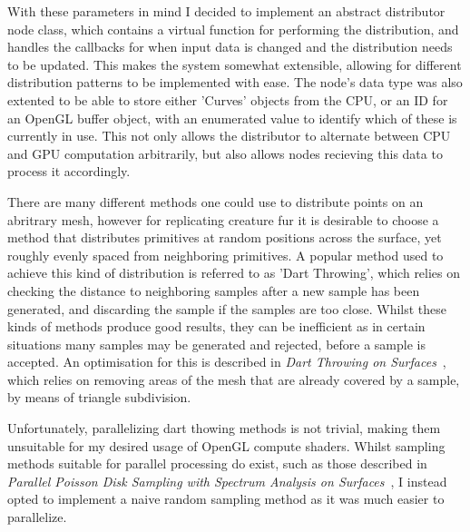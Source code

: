 \documentclass[]{acmsiggraph}
\begin{document}
With these parameters in mind I decided to implement an abstract distributor node class, which contains a virtual function for performing the distribution, and handles the callbacks for when input data is changed and the distribution needs to be updated. This makes the system somewhat extensible, allowing for different distribution patterns to be implemented with ease. The node's data type was also extented to be able to store either 'Curves' objects from the CPU, or an ID for an OpenGL buffer object, with an enumerated value to identify which of these is currently in use. This not only allows the distributor to alternate between CPU and GPU computation arbitrarily, but also allows nodes recieving this data to process it accordingly.

There are many different methods one could use to distribute points on an abritrary mesh, however for replicating creature fur it is desirable to choose a method that distributes primitives at random positions across the surface, yet roughly evenly spaced from neighboring primitives. A popular method used to achieve this kind of distribution is referred to as 'Dart Throwing', which relies on checking the distance to neighboring samples after a new sample has been generated, and discarding the sample if the samples are too close. Whilst these kinds of methods produce good results, they can be inefficient as in certain situations many samples may be generated and rejected, before a sample is accepted. An optimisation for this is described in \textit{Dart Throwing on Surfaces}~\cite{dartThrowing}, which relies on removing areas of the mesh that are already covered by a sample, by means of triangle subdivision.

Unfortunately, parallelizing dart thowing methods is not trivial, making them unsuitable for my desired usage of OpenGL compute shaders. Whilst sampling methods suitable for parallel processing do exist, such as those described in \textit{Parallel Poisson Disk Sampling with Spectrum Analysis on Surfaces}~\cite{parallelPoisson}, I instead opted to implement a naive random sampling method as it was much easier to parallelize.
\end{document}
